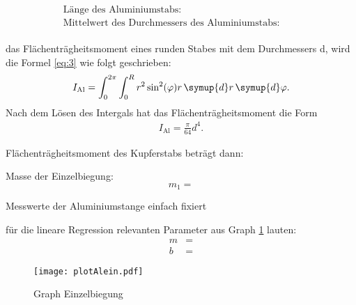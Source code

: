 \begin{subequations}\label{eq:}
\begin{align}
    &\text{Länge des Aluminiumstabs:} \qquad &\text{} \label{eq:a}\\
    &\text{Mittelwert des Durchmessers des Aluminiumstabs:} \qquad &\text{} \label{eq:b}\\
\end{align}
\end{subequations}

\justifying das Flächenträgheitsmoment eines runden Stabes mit dem Durchmessers d, wird die Formel \eqref{eq:3} 
wie folgt geschrieben:
\begin{align}
    I_{\text{Al}}=\int_{0}^{2\pi} \int_{0}^{R} r^2 \sin^2(\varphi) r \, \symup{d}r \, \symup{d}\varphi \label{eq:}.
\end{align}
Nach dem Lösen des Intergals hat das Flächenträgheitsmoment die Form
\begin{align}
     I_{\text{Al}}=\frac{\pi}{64} d^4. \label{eq:}
\end{align}

\justifying Flächenträgheitsmoment des Kupferstabs beträgt dann:


\justifying Masse der Einzelbiegung:
\begin{equation}
    m_1 = \text{} \label{eq:}
\end{equation}

\begin{table}[H]
    \centering
    
    \caption{Messwerte der Aluminiumstange einfach fixiert}
    \label{tab:3}
\end{table}

\justifying für die lineare Regression relevanten Parameter aus Graph \ref{fig:3} lauten:
\begin{subequations}\label{eq:}
\begin{align}
    m &= \text{} \label{eq:a}\\
    b &= \text{} \label{eq:b}
\end{align}
\end{subequations}

\begin{figure}[H]
    \centering
    \texttt{[image: plotAlein.pdf]}
    \caption{Graph Einzelbiegung}
    \label{fig:3}
\end{figure}

